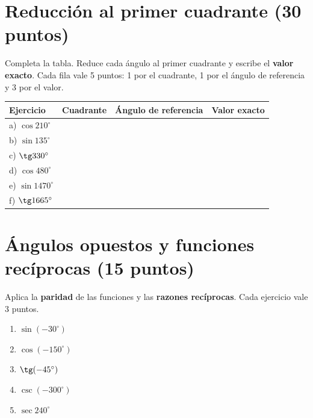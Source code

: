 \documentclass[12pt, letterpaper]{article}
\providecommand{\sen}{\sin}
\begin{document}
\section{Reducción al primer cuadrante (30 puntos)}

\begin{cuadroinfo}
  \small
  Completa la tabla. Reduce cada ángulo al primer cuadrante y escribe el
  \textbf{valor exacto}. Cada fila vale 5 puntos: 1 por el cuadrante,
  1 por el ángulo de referencia y 3 por el valor.
\end{cuadroinfo}

\begin{center}
\renewcommand{\arraystretch}{2.5}
\setlength{\tabcolsep}{9pt}
\begin{tabular}{@{}llll@{}}
  \toprule
  \textbf{Ejercicio} & \textbf{Cuadrante} & \textbf{Ángulo de referencia} & \textbf{Valor exacto} \\
  \midrule
  a) $\cos 210^\circ$  & & & \\
  b) $\sen 135^\circ$  & & & \\
  c) $\tg 330^\circ$   & & & \\
  d) $\cos 480^\circ$  & & & \\
  e) $\sen 1470^\circ$ & & & \\
  f) $\tg 1665^\circ$  & & & \\
  \bottomrule
\end{tabular}
\end{center}

\newpage
\section{Ángulos opuestos y funciones recíprocas (15 puntos)}

\begin{cuadroinfo}
  \small
  Aplica la \textbf{paridad} de las funciones y las \textbf{razones recíprocas}.
  Cada ejercicio vale 3 puntos.
\end{cuadroinfo}

\begin{enumerate}[leftmargin=*, label=\textbf{\alph*)}, itemsep=1.2em]
  \item $\sen(-30^\circ)$
  \item $\cos(-150^\circ)$
  \item $\tg(-45^\circ)$
  \item $\csc(-300^\circ)$
  \item $\sec 240^\circ$
\end{enumerate}
\end{document}
